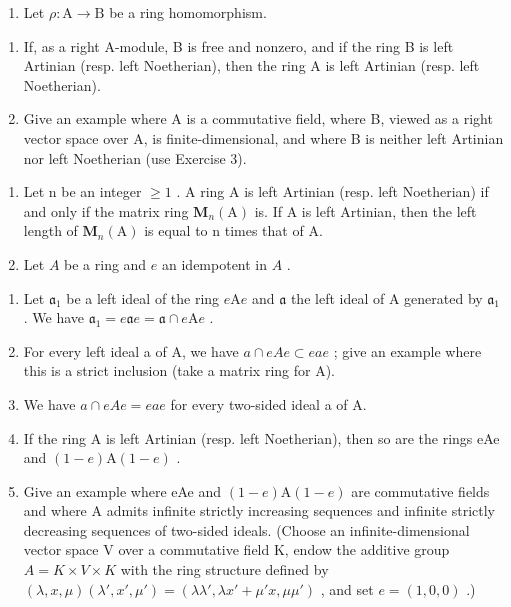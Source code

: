 \begin{enumerate}
\def\labelenumi{\arabic{enumi})}
\setcounter{enumi}{3}
\tightlist
\item
  Let \(\rho : \mathrm{A} \to \mathrm{B}\) be a ring homomorphism.
\end{enumerate}

\begin{enumerate}
\def\labelenumi{\alph{enumi})}
\item
  If, as a right A-module, B is free and nonzero, and if the ring B is left Artinian (resp. left Noetherian), then the ring A is left Artinian (resp. left Noetherian).
\item
  Give an example where A is a commutative field, where B, viewed as a right vector space over A, is finite-dimensional, and where B is neither left Artinian nor left Noetherian (use Exercise 3).
\end{enumerate}

\begin{enumerate}
\def\labelenumi{\arabic{enumi})}
\setcounter{enumi}{4}
\item
  Let n be an integer \(\geqslant 1\) . A ring A is left Artinian (resp. left Noetherian) if and only if the matrix ring \(\mathbf{M}_{n}(\mathrm{A})\) is. If A is left Artinian, then the left length of \(\mathbf{M}_{n}(\mathrm{A})\) is equal to n times that of A.
\item
  Let \(A\) be a ring and \(e\) an idempotent in \(A\) .
\end{enumerate}

\begin{enumerate}
\def\labelenumi{\alph{enumi})}
\item
  Let \(\mathfrak{a}_1\) be a left ideal of the ring \(e\mathrm{A}e\) and \(\mathfrak{a}\) the left ideal of A generated by \(\mathfrak{a}_1\) . We have \(\mathfrak{a}_1 = e\mathfrak{a}e = \mathfrak{a} \cap e\mathrm{A}e\) .
\item
  For every left ideal a of A, we have \(a \cap eAe \subset eae\) ; give an example where this is a strict inclusion (take a matrix ring for A).
\item
  We have \(a \cap eAe = eae\) for every two-sided ideal a of A.
\item
  If the ring A is left Artinian (resp. left Noetherian), then so are the rings eAe and \((1-e)\mathrm{A}(1-e)\) .
\item
  Give an example where eAe and \((1-e)\mathrm{A}(1-e)\) are commutative fields and where A admits infinite strictly increasing sequences and infinite strictly decreasing sequences of two-sided ideals. (Choose an infinite-dimensional vector space V over a commutative field K, endow the additive group \(A=K\times V\times K\) with the ring structure defined by \((\lambda,x,\mu)(\lambda',x',\mu')=(\lambda\lambda',\lambda x'+\mu'x,\mu\mu')\) , and set \(e=(1,0,0)\) .)
\end{enumerate}


